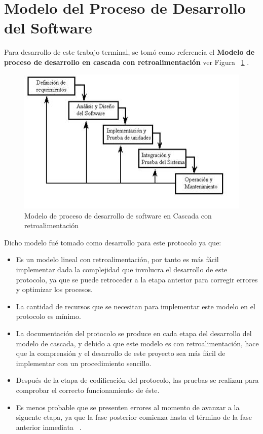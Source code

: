 \section{Modelo del Proceso de Desarrollo del Software}

Para desarrollo de este trabajo terminal, se tomó como referencia el \textbf{Modelo de proceso de desarrollo en cascada con retroalimentación} ver Figura ~\ref{fig:4-5-1} . 

\begin{figure}[H]
\centering
\includegraphics[width=12cm, height=7cm]{./images/cascada.jpg}
\caption{Modelo de proceso de desarrollo de software en Cascada con retroalimentación}
\label{fig:4-5-1} 
\end{figure} 

Dicho modelo fué tomado como desarrollo para este protocolo ya que: 

  \begin{itemize}
	\item Es un modelo lineal con retroalimentación, por tanto es más fácil implementar dada la complejidad que involucra el desarrollo de este protocolo, ya que se puede retroceder a la etapa anterior para corregir errores y optimizar los procesos.
	\item La cantidad de recursos que se necesitan para implementar este modelo en el protocolo es mínimo.
	\item La documentación del protocolo se produce en cada etapa del desarrollo del modelo de cascada, y debido a que este modelo es con retroalimentación, hace que la comprensión y el desarrollo de este proyecto sea más fácil de implementar con un procedimiento sencillo.
	\item Después de la etapa de codificación del protocolo, las pruebas se realizan para comprobar el correcto funcionamiento de éste.
	\item Es menos probable que se presenten errores al momento de avanzar a la siguente etapa, ya que la fase posterior comienza hasta el término de la fase anterior inmediata ~\cite{sommerville}. 
\end{itemize}

